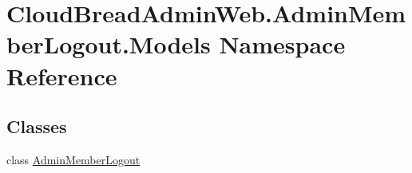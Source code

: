 \hypertarget{a00419}{}\section{Cloud\+Bread\+Admin\+Web.\+Admin\+Member\+Logout.\+Models Namespace Reference}
\label{a00419}
\subsection*{Classes}
\begin{DoxyCompactItemize}
\item 
class \hyperlink{a00011}{Admin\+Member\+Logout}
\end{DoxyCompactItemize}
